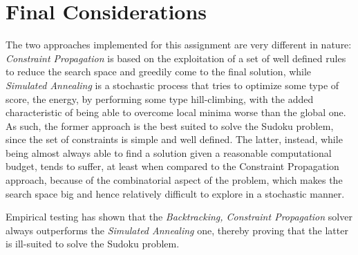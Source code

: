 \chapter*{Final Considerations}

The two approaches implemented for this assignment are very different in nature: \textit{Constraint Propagation} is based on the exploitation of a set of well defined rules to reduce the search space and greedily come to the final solution, while \textit{Simulated Annealing} is a stochastic process that tries to optimize some type of score, the energy, by performing some type hill-climbing, with the added characteristic of being able to overcome local minima worse than the global one. As such, the former approach is the best suited to solve the Sudoku problem, since the set of constraints is simple and well defined. The latter, instead, while being almost always able to find a solution given a reasonable computational budget, tends to suffer, at least when compared to the Constraint Propagation approach, because of the combinatorial aspect of the problem, which makes the search space big and hence relatively difficult to explore in a stochastic manner.
\par
Empirical testing has shown that the \textit{Backtracking, Constraint Propagation} solver always outperforms the \textit{Simulated Annealing} one, thereby proving that the latter is ill-suited to solve the Sudoku problem.